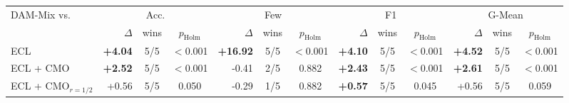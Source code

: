 \begin{tabular}{lrccrccrccrcc}
\toprule
DAM-Mix vs. & \multicolumn{3}{c}{Acc.} & \multicolumn{3}{c}{Few} & \multicolumn{3}{c}{F1} & \multicolumn{3}{c}{G-Mean} \\
 & $\Delta$ & wins & $p_{\mathrm{Holm}}$ & $\Delta$ & wins & $p_{\mathrm{Holm}}$ & $\Delta$ & wins & $p_{\mathrm{Holm}}$ & $\Delta$ & wins & $p_{\mathrm{Holm}}$ \\
\midrule
ECL & \textbf{+4.04} & 5/5 & $<$0.001 & \textbf{+16.92} & 5/5 & $<$0.001 & \textbf{+4.10} & 5/5 & $<$0.001 & \textbf{+4.52} & 5/5 & $<$0.001 \\
ECL + CMO & \textbf{+2.52} & 5/5 & $<$0.001 & -0.41 & 2/5 & 0.882 & \textbf{+2.43} & 5/5 & $<$0.001 & \textbf{+2.61} & 5/5 & $<$0.001 \\
ECL + CMO$_{r=1/2}$ & +0.56 & 5/5 & 0.050 & -0.29 & 1/5 & 0.882 & \textbf{+0.57} & 5/5 & 0.045 & +0.56 & 5/5 & 0.059 \\
\bottomrule
\end{tabular}
